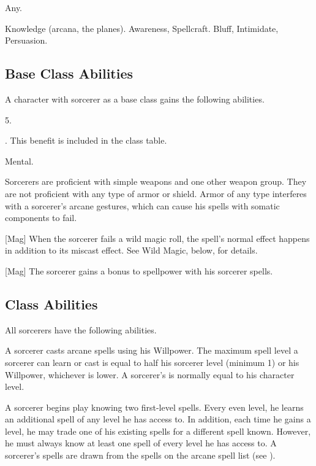      Any.

     Knowledge (arcana, the planes).
     Awareness, Spellcraft.
     Bluff, Intimidate, Persuasion.

    \subsection{Base Class Abilities}
        A character with sorcerer as a base class gains the following abilities.

         5.

         . This benefit is included in the class table.

          Mental.

        Sorcerers are proficient with simple weapons  and one other weapon group.
        They are not proficient with any type of armor or shield.
        Armor of any type interferes with a sorcerer's arcane gestures, which can cause his spells with somatic components to fail.

        [Mag]
        When the sorcerer fails a wild magic roll, the spell's normal effect happens in addition to its miscast effect.
        See Wild Magic, below, for details.

        [Mag]
        The sorcerer gains a  bonus to spellpower with his sorcerer spells.

    \subsection{Class Abilities}
        All sorcerers have the following abilities.

        A sorcerer casts arcane spells using his Willpower.
        The maximum spell level a sorcerer can learn or cast is equal to half his sorcerer level (minimum 1) or his Willpower, whichever is lower.
        A sorcerer's  is normally equal to his character level.

        A sorcerer begins play knowing two first-level spells.
        Every even level, he learns an additional spell of any level he has access to.
        In addition, each time he gains a level, he may trade one of his existing spells for a different spell known.
        However, he must always know at least one spell of every level he has access to.
        A sorcerer's spells are drawn from the spells on the arcane spell list (see ).

